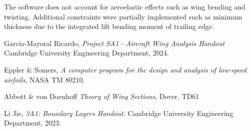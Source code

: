 \documentclass{article}
\begin{document}
The software does not account for aeroelastic effects such as wing bending and twisting.
Additional constraints were partially implemented such as minimum thickness due to the integrated lift bending moment of trailing edge.


\begin{thebibliography}{9}
    Garcia-Mayoral Ricardo, \textit{Project SA1—Aircraft Wing Analysis Handout} Cambridge University Engineering Department, 2024.

    Eppler \& Somers, \textit{A computer program for the design and analysis of low-speed airfoils}, NASA TM 80210.

    Abbott \& von Doenhoff \textit{Theory of Wing Sections}, Dover, TD61

    Li Jie, \textit{3A1: Boundary Layers Handout}. Cambridge University Engineering Department, 2023.
\end{thebibliography}
\end{document}
